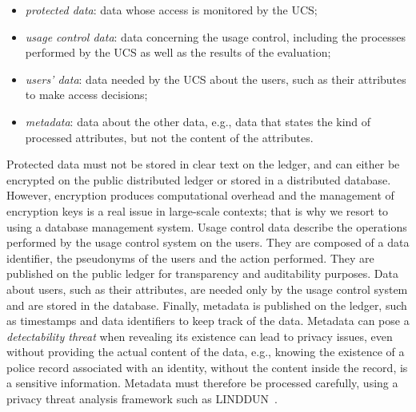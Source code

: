 \begin{itemize}
    \item \emph{protected data}: data whose access is monitored by the UCS;
    \item \emph{usage control data}: data concerning the usage control, including the processes performed by the UCS as well as the results of the evaluation;
    \item \emph{users' data}: data needed by the UCS about the users, such as their attributes to make access decisions;
    \item \emph{metadata}: data about the other data, e.g., data that states the kind of processed attributes, but not the content of the attributes.
\end{itemize}

Protected data must not be stored in clear text on the ledger, and can either be encrypted on the public distributed ledger or stored in a distributed database. However, encryption produces computational overhead and the management of encryption keys is a real issue in large-scale contexts; that is why we resort to using a database management system. Usage control data describe the operations performed by the usage control system on the users. They are composed of a data identifier, the pseudonyms of the users and the action performed. They are published on the public ledger for transparency and auditability purposes. Data about users, such as their attributes, are needed only by the usage control system and are stored in the database. Finally, metadata is published on the ledger, such as timestamps and data identifiers to keep track of the data. Metadata can pose a \emph{detectability threat} when revealing its existence can lead to privacy issues, even without providing the actual content of the data, e.g., knowing the existence of a police record associated with an identity, without the content inside the record, is a sensitive information. Metadata must therefore be processed carefully, using a privacy threat analysis framework such as LINDDUN~\cite{Deng2011}.

\begin{table}[ht] 
    \centering
      \caption{Data types and their respective storage area \\ * If detectability is not an issue}
      \label{tab:storage}
    \end{table}  
